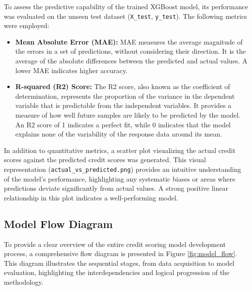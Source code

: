 \documentclass{article}
\begin{document}
To assess the predictive capability of the trained XGBoost model, its performance was evaluated on the unseen test dataset (\texttt{X\_test}, \texttt{y\_test}). The following metrics were employed:

\begin{itemize}
    \item \textbf{Mean Absolute Error (MAE):} MAE measures the average magnitude of the errors in a set of predictions, without considering their direction. It is the average of the absolute differences between the predicted and actual values. A lower MAE indicates higher accuracy.

    \item \textbf{R-squared (R2) Score:} The R2 score, also known as the coefficient of determination, represents the proportion of the variance in the dependent variable that is predictable from the independent variables. It provides a measure of how well future samples are likely to be predicted by the model. An R2 score of 1 indicates a perfect fit, while 0 indicates that the model explains none of the variability of the response data around its mean.
\end{itemize}

In addition to quantitative metrics, a scatter plot visualizing the actual credit scores against the predicted credit scores was generated. This visual representation (\texttt{actual\_vs\_predicted.png}) provides an intuitive understanding of the model's performance, highlighting any systematic biases or areas where predictions deviate significantly from actual values. A strong positive linear relationship in this plot indicates a well-performing model.

\subsection{Model Flow Diagram}

To provide a clear overview of the entire credit scoring model development process, a comprehensive flow diagram is presented in Figure \ref{fig:model_flow}. This diagram illustrates the sequential stages, from data acquisition to model evaluation, highlighting the interdependencies and logical progression of the methodology.
\end{document}
